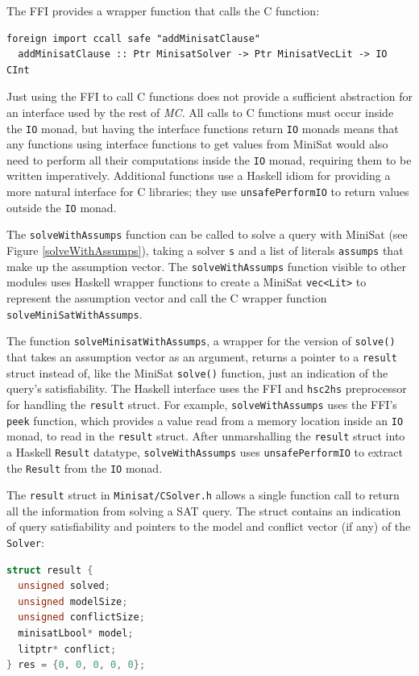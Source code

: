 \documentclass[12pt,a4paper,twoside,openright]{report}
\begin{document}
{{The FFI provides a wrapper function that calls
the C function:
\begin{lstlisting}
foreign import ccall safe "addMinisatClause"
  addMinisatClause :: Ptr MinisatSolver -> Ptr MinisatVecLit -> IO CInt
\end{lstlisting}

Just using the FFI to call C functions does not provide a
sufficient abstraction for an interface used by the rest of \emph{MC}. All
calls to C functions must occur inside the \verb,IO, monad, but having
the interface functions return \verb,IO, monads means that any functions
using interface functions to get values from MiniSat would also need to
perform all their computations inside the \verb,IO, monad, requiring them to
be written imperatively.
Additional functions use a Haskell idiom for providing a more natural
interface for C libraries; they use \verb,unsafePerformIO, to return
values outside the \verb,IO, monad.

The \verb,solveWithAssumps, function can be called to
solve a query with MiniSat (see Figure \ref{solveWithAssumps}),
taking a solver \verb,s, and a list of literals \verb,assumps,
that make up the assumption vector. The \verb,solveWithAssumps, function
visible to other modules uses Haskell wrapper functions to create
a MiniSat \verb,vec<Lit>, to represent the assumption vector and call
the C wrapper function \verb,solveMiniSatWithAssumps,.

The function \verb,solveMinisatWithAssumps,, a wrapper for the version of \verb,solve(),
that takes an assumption vector as an argument, returns a pointer to a
\verb,result, struct instead of, like the MiniSat \verb,solve(), function,
just an indication of the query's satisfiability.
The Haskell interface uses the FFI and \verb,hsc2hs, preprocessor
for handling the \verb,result, struct. For example, \verb,solveWithAssumps,
uses the FFI's \verb,peek, function,
which provides a value read from a memory location inside
an \verb,IO, monad, to read in the \verb,result, struct. After unmarshalling
the \verb,result, struct into a Haskell \verb,Result, datatype, \verb,solveWithAssumps,
uses \verb,unsafePerformIO, to extract the \verb,Result, from the \verb,IO, monad.

The \verb,result, struct in \verb,Minisat/CSolver.h,
allows a single function call to return
all the information from solving a SAT query. The struct contains an indication of query satisfiability
and pointers to the model and conflict vector (if any) of the \verb,Solver,:
\begin{lstlisting}[language=C]
struct result {
  unsigned solved;
  unsigned modelSize;
  unsigned conflictSize;
  minisatLbool* model;
  litptr* conflict;
} res = {0, 0, 0, 0, 0};
\end{lstlisting}

}}
\end{document}
